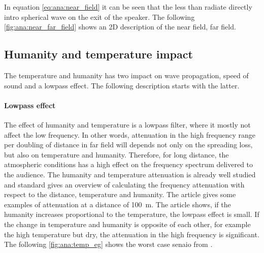 \startexplain
{}
\stopexplain

In equation \autoref{eq:ana:near_field} it can be seen that the less than  radiate directly intro spherical wave on the exit of the speaker. The following \autoref{fig:ana:near_far_field} shows an 2D description of the near field, far field. 



\subsection{Humanity and temperature impact}\label{sec:ana:hu_temp}
The temperature and humanity has two impact on wave propagation, speed of sound and a lowpass effect. The following description starts with the latter. 


\paragraph{Lowpass effect} The effect of humanity and temperature is a lowpass filter, where it mostly not affect the low frequency. In other words, attenuation in the high frequency range per doubling of distance in far field will depends not only on the spreading loss, but also on temperature and humanity. Therefore, for long distance, the atmospheric conditions has a high effect on the frequency spectrum delivered to the audience. The humanity and temperature attenuation is already well studied and standard  \citep{iso_9613-1} gives an overview of calculating the frequency attenuation with respect to the distance, temperature and humanity. The article \citep{corteel2017large} gives some examples of attenuation at a distance of \SI{100}{\meter}. The article \citep{corteel2017large} shows, if the humanity increases proportional to the temperature, the lowpass effect is small. If the change in temperature and humanity is opposite of each other, for example the high temperature but dry, the attenuation in the high frequency is significant. The following \autoref{fig:ana:temp_eg} shows the worst case senaio from \citep{corteel2017large}.

 

